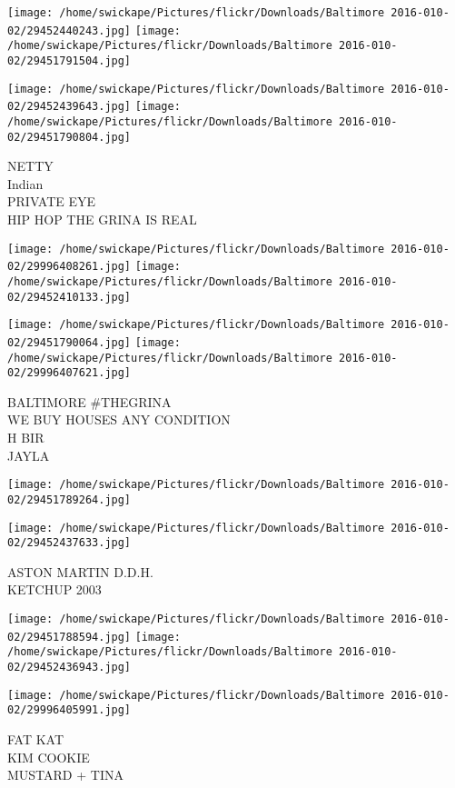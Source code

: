 \documentclass[10pt,letterpaper]{article}
\begin{document}
\texttt{[image: /home/swickape/Pictures/flickr/Downloads/Baltimore 2016-010-02/29452440243.jpg]}
\texttt{[image: /home/swickape/Pictures/flickr/Downloads/Baltimore 2016-010-02/29451791504.jpg]}

\texttt{[image: /home/swickape/Pictures/flickr/Downloads/Baltimore 2016-010-02/29452439643.jpg]}
\texttt{[image: /home/swickape/Pictures/flickr/Downloads/Baltimore 2016-010-02/29451790804.jpg]}

NETTY\\
Indian\\
PRIVATE EYE\\
HIP HOP THE GRINA IS REAL
\pagebreak

\texttt{[image: /home/swickape/Pictures/flickr/Downloads/Baltimore 2016-010-02/29996408261.jpg]}
\texttt{[image: /home/swickape/Pictures/flickr/Downloads/Baltimore 2016-010-02/29452410133.jpg]}

\texttt{[image: /home/swickape/Pictures/flickr/Downloads/Baltimore 2016-010-02/29451790064.jpg]}
\texttt{[image: /home/swickape/Pictures/flickr/Downloads/Baltimore 2016-010-02/29996407621.jpg]}

BALTIMORE \#THEGRINA\\
WE BUY HOUSES ANY CONDITION\\
H BIR\\
JAYLA
\pagebreak

\texttt{[image: /home/swickape/Pictures/flickr/Downloads/Baltimore 2016-010-02/29451789264.jpg]}

\vspace{0.25in}
\texttt{[image: /home/swickape/Pictures/flickr/Downloads/Baltimore 2016-010-02/29452437633.jpg]}

ASTON MARTIN D.D.H.\\
KETCHUP 2003
\pagebreak

\texttt{[image: /home/swickape/Pictures/flickr/Downloads/Baltimore 2016-010-02/29451788594.jpg]}
\texttt{[image: /home/swickape/Pictures/flickr/Downloads/Baltimore 2016-010-02/29452436943.jpg]}

\vspace{0.25in}
\texttt{[image: /home/swickape/Pictures/flickr/Downloads/Baltimore 2016-010-02/29996405991.jpg]}

FAT KAT\\
KIM COOKIE\\
MUSTARD + TINA
\pagebreak
\end{document}
